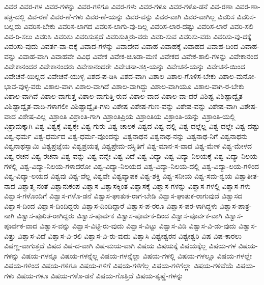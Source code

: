 {ವಿವರ
ವಿವರ-ಗಳ
ವಿವರ-ಗಳನ್ನು
ವಿವರ-ಗಳಿಗೂ
ವಿವರ-ಗಳು
ವಿವರ-ಗಳೂ
ವಿವರ-ಗಳೊ-ಡನೆ
ವಿವ-ರಣಾ
ವಿವರ-ಣಾ-ಪತ್ರ-ದಲ್ಲಿ
ವಿವ-ರಣೆ
ವಿವರ-ಣೆ-ಗಳು
ವಿವರ-ಣೆ-ಯನ್ನು
ವಿವರ-ವನ್ನು
ವಿವರ-ವಾಗಿ
ವಿವರ-ವಾಗಿಲ್ಲ
ವಿವರಿಸ
ವಿವರಿಸ-ಬಲ್ಲದು
ವಿವರಿಸ-ಬೇಕು
ವಿವರಿಸ-ಲಾಗದ
ವಿವರಿಸ-ಲಾಗು-ವು-ದಿಲ್ಲ
ವಿವರಿಸ-ಲಾರ-ದಷ್ಟು
ವಿವರಿಸ-ಲಾರೆ
ವಿವರಿ-ಸಲಿ
ವಿವ-ರಿ-ಸಲು
ವಿವರಿಸಿ
ವಿವರಿಸು
ವಿವರಿಸುತ್ತದೆ
ವಿವರಿಸುತ್ತಿರು-ವರು
ವಿವರಿ-ಸುವ
ವಿವರಿಸು-ವರು
ವಿವರಿಸು-ವು-ದಕ್ಕೆ
ವಿವರಿಸು-ವುದು
ವಿವರ್ತ-ವಾ-ದಕ್ಕೆ
ವಿವಾದ-ಗಳನ್ನು
ವಿವಾದೇವ
ವಿವಾಹ
ವಿವಾಹಕ್ಕೆ
ವಿವಾಹದ
ವಿವಾಹ-ದಿಂದ
ವಿವಾಹ-ವನ್ನು
ವಿವಾಹ-ವಾಗಿ
ವಿವಾಹವೇ
ವಿವಿಧ
ವಿವೇಕ
ವಿವೇಕ-ಚೂಡಾ-ಮಣಿ
ವಿವೇಕದ
ವಿವೇಕ-ಶಾಲಿ-ಗಳನ್ನು
ವಿವೇಕಾನಂದ
ವಿವೇಕಾನಂದರ
ವಿವೇಕಾನಂದರು
ವಿವೇಕಾನಂದರೇ
ವಿವೇಚನಾ-ಶಕ್ತಿ-ಯನ್ನು
ವಿವೇಚನೆ-ಯನ್ನು
ವಿವೇಚನೆ-ಯಿಂದ
ವಿವೇಚನೆ-ಯಿಲ್ಲದ
ವಿವೇಚನೆ-ಯುಳ್ಳ
ವಿಶದ-ಪ-ಡಿಸಿ
ವಿಶದ-ವಾಗಿ
ವಿಶಾಲ
ವಿಶಾಲ-ಗೊಳಿಸ-ಬೇಕು
ವಿಶಾಲ-ಮನೋ-ಭಾವ-ವುಳ್ಳ-ವರು
ವಿಶಾಲ-ವಾಗಿ
ವಿಶಾಲ-ವಾಗಿದೆ
ವಿಶಾಲ-ವಾಗಿದ್ದು
ವಿಶಾಲ-ವಾಗಿಯೂ
ವಿಶಾಲ-ವಾಗಿ-ರ-ಬೇಕು
ವಿಶಾಲ-ವಾಗಿವೆ
ವಿಶಾಲ-ವಾಗುತ್ತ
ವಿಶಾಲ-ವಾಗುತ್ತಿ-ರುವ
ವಿಶಾಲ-ವಾದ
ವಿಶಾಲ-ವಾ-ದರೆ
ವಿಶಿಷ್ಟ
ವಿಶಿಷ್ಟಾದ್ವೈತ
ವಿಶಿಷ್ಟಾದ್ವೈತ-ವಾದಿ-ಗಳಾಗಲೀ
ವಿಶಿಷ್ಟಾದ್ವೈತಿ-ಗಳು
ವಿಶೇಷ
ವಿಶೇಷ-ಗುಣ-ವನ್ನು
ವಿಶೇಷ-ವನ್ನು
ವಿಶೇಷ-ವಾಗಿ
ವಿಶೇಷ-ವಾದ
ವಿಶೇಷ-ವಿಲ್ಲ
ವಿಶ್ರಾಂತಿ
ವಿಶ್ರಾಂತಿ-ಗಾಗಿ
ವಿಶ್ರಾಂತಿಪ್ರಿಯ
ವಿಶ್ರಾಂತಿಯ
ವಿಶ್ರಾಂತಿ-ಯನ್ನು
ವಿಶ್ರಾಂತಿ-ಯಲ್ಲಿ
ವಿಶ್ರಾಮಕ್ಕಾಗಿ
ವಿಶ್ವ
ವಿಶ್ವಕ್ಕೆ
ವಿಶ್ವಕ್ಕೇ
ವಿಶ್ವ-ಗುರು
ವಿಶ್ವ-ಚಾಲಕ
ವಿಶ್ವದ
ವಿಶ್ವ-ದಲ್ಲಿ
ವಿಶ್ವ-ದಲ್ಲೆಲ್ಲ
ವಿಶ್ವ-ದಲ್ಲೇ
ವಿಶ್ವ-ದಷ್ಟು
ವಿಶ್ವ-ಧರ್ಮ
ವಿಶ್ವ-ಧರ್ಮದ
ವಿಶ್ವ-ಧರ್ಮ-ವೊಂದನ್ನು
ವಿಶ್ವನಾಥನ
ವಿಶ್ವನಾಥ-ನನ್ನು
ವಿಶ್ವನಾಥ-ನಿಗೆ
ವಿಶ್ವನಾಥನು
ವಿಶ್ವನಾಥಸ್ವಾಮಿ
ವಿಶ್ವಪ್ರಜ್ಞೆಯ
ವಿಶ್ವಪ್ರಯತ್ನ
ವಿಶ್ವಪ್ರೇಮ-ದಸ್ಥಿತಿಗೆ
ವಿಶ್ವ-ಮಾನ-ಸ-ವಾದ
ವಿಶ್ವ-ಮೇಳ
ವಿಶ್ವ-ಮೇಳದ
ವಿಶ್ವ-ರಚನ
ವಿಶ್ವ-ರಚನಾ
ವಿಶ್ವ-ವನ್ನು
ವಿಶ್ವ-ವನ್ನೇ
ವಿಶ್ವ-ವಿದೆ
ವಿಶ್ವ-ವಿದ್ಯಾ
ವಿಶ್ವ-ವಿದ್ಯಾ-ನಿಲಯಕ್ಕೆ
ವಿಶ್ವ-ವಿದ್ಯಾ-ನಿಲಯ-ಗಳಲ್ಲಿ
ವಿಶ್ವ-ವಿದ್ಯಾ-ನಿಲಯ-ಗಳಾದರೋ
ವಿಶ್ವ-ವಿದ್ಯಾ-ನಿಲಯದ
ವಿಶ್ವ-ವಿದ್ಯಾ-ನಿಲಯ-ದಲ್ಲಿ
ವಿಶ್ವ-ವಿದ್ಯಾ-ಲಯ-ಗಳಿಂದ
ವಿಶ್ವ-ವಿದ್ಯಾ-ಲಯದ
ವಿಶ್ವವು
ವಿಶ್ವ-ವೆಲ್ಲ
ವಿಶ್ವವೇ
ವಿಶ್ವವ್ಯಾಪಕ
ವಿಶ್ವ-ಶಕ್ತಿ
ವಿಶ್ವ-ಸನೀಯ
ವಿಶ್ವ-ಸಮ-ನ್ವಯ
ವಿಶ್ವಾತೀತ-ನಾದ
ವಿಶ್ವಾತ್ಮ-ನಂತೆ
ವಿಶ್ವಾನುಕಂಪ
ವಿಶ್ವಾಸ
ವಿಶ್ವಾಸಕ್ಕಿಂತ
ವಿಶ್ವಾಸಕ್ಕೆ
ವಿಶ್ವಾಸ-ಗಳನ್ನು
ವಿಶ್ವಾಸ-ಗಳಲ್ಲಿ
ವಿಶ್ವಾಸ-ಗಳು
ವಿಶ್ವಾಸ-ಗಳೊಂದಿಗೆ
ವಿಶ್ವಾಸ-ಗಳೊ-ಡನೆ
ವಿಶ್ವಾಸ-ಘಾತುಕ-ರಾಗ-ಬೇಡಿ
ವಿಶ್ವಾಸ-ಘಾತುಕ-ರಾಗುವುದೆ
ವಿಶ್ವಾಸದ
ವಿಶ್ವಾಸ-ದಿಂದ
ವಿಶ್ವಾಸ-ದಿಂದಿದ್ದರು
ವಿಶ್ವಾಸ-ದಿಂದಿದ್ದಾರೆ
ವಿಶ್ವಾಸ-ಪ-ರರೂ
ವಿಶ್ವಾಸ-ಪರ-ಳಾಗಿದ್ದಳು
ವಿಶ್ವಾಸ-ಪಾತ್ರ-ನಾಗಿ
ವಿಶ್ವಾಸ-ಪೂರಿತ-ರಾಗಿದ್ದರು
ವಿಶ್ವಾಸ-ಪೂರ್ವಕ
ವಿಶ್ವಾಸ-ಪೂರ್ವಕ-ದಿಂದ
ವಿಶ್ವಾಸ-ಪೂರ್ವಕ-ವಾಗಿ
ವಿಶ್ವಾಸ-ಪೂರ್ವಕ-ವಾದ
ವಿಶ್ವಾಸ-ವನ್ನು
ವಿಶ್ವಾಸ-ವಿಟ್ಟಿ-ರು-ವುದು
ವಿಶ್ವಾಸ-ವಿಟ್ಟು
ವಿಶ್ವಾಸ-ವಿಡಿ
ವಿಶ್ವಾಸ-ವಿ-ಡು-ವುದು
ವಿಶ್ವಾಸ-ವಿತ್ತು
ವಿಶ್ವಾಸ-ವಿದೆ
ವಿಶ್ವಾಸ-ವಿ-ರಲಿ
ವಿಶ್ವಾಸ-ವಿ-ರು-ವುದು
ವಿಶ್ವಾಸಿ
ವಿಶ್ವೇಶ್ವರನ
ವಿಶ್ವೇಶ್ವರಿ
ವಿಷ
ವಿಷ-ಕಾರಲು
ವಿಷಣ್ಣ-ವಾಗುತ್ತದೆ
ವಿಷದ
ವಿಷ-ದ-ವಾಗಿ
ವಿಷ-ಮಯ-ವಾಗಿ
ವಿಷಯ
ವಿಷಯಕ್ಕೆ
ವಿಷಯಕ್ಕೆಲ್ಲ
ವಿಷಯ-ಗಳ
ವಿಷಯ-ಗಳನ್ನು
ವಿಷಯ-ಗಳನ್ನೂ
ವಿಷಯ-ಗಳನ್ನೆಲ್ಲ
ವಿಷಯ-ಗಳನ್ನೆಲ್ಲಾ
ವಿಷಯ-ಗಳಲ್ಲಿ
ವಿಷಯ-ಗಳಲ್ಲೂ
ವಿಷಯ-ಗಳಲ್ಲೇ
ವಿಷಯ-ಗಳಿಂದ
ವಿಷಯ-ಗಳಿಗೂ
ವಿಷಯ-ಗಳಿಗೆ
ವಿಷಯ-ಗಳಿಗೆಲ್ಲ
ವಿಷಯ-ಗಳಿಗೆಲ್ಲಾ
ವಿಷಯ-ಗಳಿವೆಯೆ
ವಿಷಯ-ಗಳು
ವಿಷಯ-ಗಳೂ
ವಿಷಯ-ಗಳೊ-ಡನೆ
ವಿಷಯ-ಗೊತ್ತಿದೆ
ವಿಷಯ-ತೃಷ್ಣೆ-ಗಳನ್ನು
}
